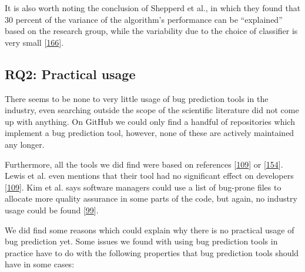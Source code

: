 \documentclass[]{book}
\begin{document}
It is also worth noting the conclusion of Shepperd et al., in which they
found that 30 percent of the variance of the algorithm's performance can
be ``explained'' based on the research group, while the variability due
to the choice of classifier is very small
{[}\protect\hyperlink{ref-Shepperd2014}{166}{]}.

\subsection{RQ2: Practical usage}\label{rq2-practical-usage}

There seems to be none to very little usage of bug prediction tools in
the industry, even searching outside the scope of the scientific
literature did not come up with anything. On GitHub we could only find a
handful of repositories which implement a bug prediction tool, however,
none of these are actively maintained any longer.

Furthermore, all the tools we did find were based on references
{[}\protect\hyperlink{ref-Lewis2013}{109}{]} or
{[}\protect\hyperlink{ref-rahman2011}{154}{]}. Lewis et al. even
mentions that their tool had no significant effect on developers
{[}\protect\hyperlink{ref-Lewis2013}{109}{]}. Kim et al. says software
managers could use a list of bug-prone files to allocate more quality
assurance in some parts of the code, but again, no industry usage could
be found {[}\protect\hyperlink{ref-kim2007}{99}{]}.

We did find some reasons which could explain why there is no practical
usage of bug prediction yet. Some issues we found with using bug
prediction tools in practice have to do with the following properties
that bug prediction tools should have in some cases:
\end{document}
